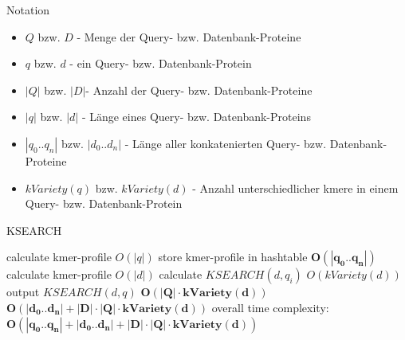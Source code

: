 \documentclass[xcolor=dvipsnames, aspectratio=1610]{beamer}
\begin{document}
\begin{frame}{Notation}
  \begin{itemize}
    \item $Q$ bzw. $D$ - Menge der Query- bzw. Datenbank-Proteine
    \item $q$ bzw. $d$ - ein Query- bzw. Datenbank-Protein
    \item $|Q|$ bzw. $|D|$- Anzahl der Query- bzw. Datenbank-Proteine
    \item $|q|$ bzw. $|d|$ - Länge eines Query- bzw. Datenbank-Proteins
    \item $|q_0..q_n|$ bzw. $|d_0..d_n|$ - Länge aller konkatenierten Query- bzw. Datenbank-Proteine
    \item $kVariety(q)$ bzw. $kVariety(d)$ - Anzahl unterschiedlicher kmere in einem Query- bzw. Datenbank-Protein
  \end{itemize}
\end{frame}

\begin{frame}{KSEARCH}
 \begin{algorithmic}
        \State calculate kmer-profile \Comment $O(|q|)$
        \State store kmer-profile in hashtable
      \EndFor \Comment $\boldsymbol{O(|q_0..q_n|)}$
         \State calculate kmer-profile \Comment $O(|d|)$
           \State calculate $KSEARCH(d,q_{i})$ \Comment $O(kVariety(d))$   
           \State output $KSEARCH(d,q)$
         \EndFor \Comment $\boldsymbol{ O(|Q| \cdot kVariety(d))}$
       \EndFor   \Comment $\boldsymbol{O(|d_0..d_n|+|D| \cdot |Q| \cdot kVariety(d))}$  
    \EndFunction \Comment overall time complexity: $\boldsymbol{O(|q_0..q_n|+|d_0..d_n|+|D| \cdot |Q| \cdot kVariety(d))}$

  \end{algorithmic}
\end{frame}
\end{document}
